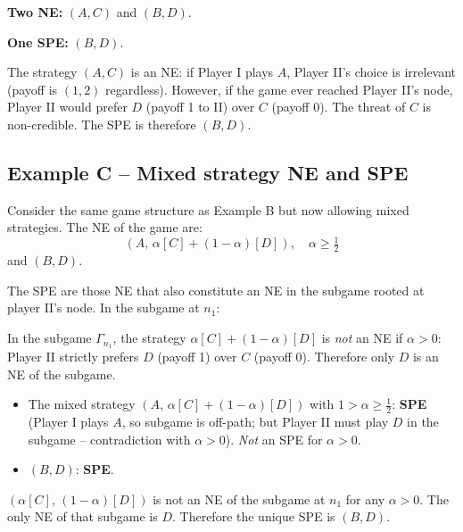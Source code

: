 \documentclass[12pt, a4paper]{article}
\begin{document}
\noindent\textbf{Two NE:} $(A, C)$ and $(B, D)$.

\noindent\textbf{One SPE:} $(B, D)$.

The strategy $(A, C)$ is an NE: if Player I plays $A$, Player II's choice
is irrelevant (payoff is $(1,2)$ regardless). However, if the game ever
reached Player II's node, Player II would prefer $D$ (payoff 1 to II) over
$C$ (payoff 0). The threat of $C$ is non-credible. The SPE is therefore
$(B, D)$.

\subsection*{Example C -- Mixed strategy NE and SPE}

Consider the same game structure as Example B but now allowing mixed
strategies. The NE of the game are:
\[
  (A,\, \alpha[C] + (1-\alpha)[D]), \quad \alpha \geq \tfrac{1}{2}
\]
and $(B, D)$.

The SPE are those NE that also constitute an NE in the subgame rooted at
player II's node. In the subgame at $n_1$:
\begin{center}
\end{center}

In the subgame $\Gamma_{n_1}$, the strategy $\alpha[C] + (1-\alpha)[D]$ is
\emph{not} an NE if $\alpha > 0$: Player II strictly prefers $D$ (payoff 1)
over $C$ (payoff 0). Therefore only $D$ is an NE of the subgame.

\begin{itemize}
  \item The mixed strategy $(A,\, \alpha[C]+(1-\alpha)[D])$ with $1 > \alpha
        \geq \tfrac{1}{2}$: \textbf{SPE} (Player I plays $A$, so subgame is
        off-path; but Player II must play $D$ in the subgame -- contradiction
        with $\alpha>0$). \emph{Not} an SPE for $\alpha > 0$.
  \item $(B, D)$: \textbf{SPE}.
\end{itemize}

\begin{notebox}
  $(\alpha[C],\,(1-\alpha)[D])$ is not an NE of the subgame at $n_1$ for any
  $\alpha > 0$. The only NE of that subgame is $D$. Therefore the unique SPE
  is $(B, D)$.
\end{notebox}
\end{document}
